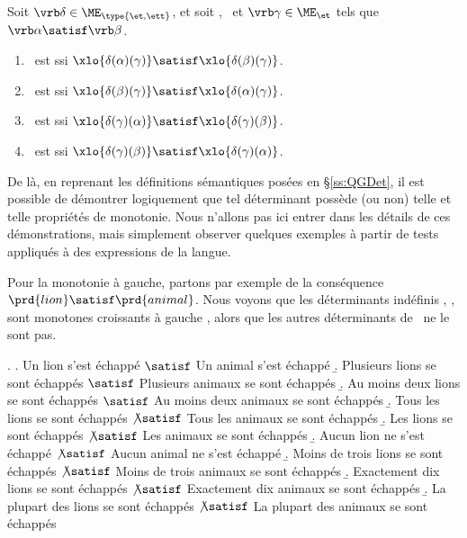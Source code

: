 \begin{defi}
  Soit $\vrb\delta\in\ME_{\type{\et,\ett}}$, et soit
  \vrb\alpha, \vrb\beta\ et $\vrb\gamma\in \ME_{\et}$ tels que $\vrb\alpha\satisf\vrb\beta$. 
\begin{enumerate}
  \item \vrb\delta\ est  ssi $\xlo{\delta(\alpha)(\gamma)}\satisf\xlo{\delta(\beta)(\gamma)}$.
  \item \vrb\delta\ est  ssi $\xlo{\delta(\beta)(\gamma)}\satisf\xlo{\delta(\alpha)(\gamma)}$.
  \item \vrb\delta\ est  ssi $\xlo{\delta(\gamma)(\alpha)}\satisf\xlo{\delta(\gamma)(\beta)}$.
  \item \vrb\delta\ est  ssi $\xlo{\delta(\gamma)(\beta)}\satisf\xlo{\delta(\gamma)(\alpha)}$.
\end{enumerate}
\end{defi}


De là, en reprenant les définitions sémantiques posées en \S\ref{ss:QGDet}, il est possible de démontrer logiquement que tel déterminant possède (ou non) telle et telle propriétés de monotonie.  Nous n'allons pas ici entrer dans les détails de ces démonstrations, mais simplement observer quelques exemples à partir de tests appliqués à des expressions de la langue.


Pour la monotonie à gauche, partons par exemple de la conséquence $\prd{lion}\satisf\prd{animal}$.  Nous voyons que les déterminants indéfinis , ,  sont monotones croissants à gauche \Next[a-c], alors que les autres déterminants de \Next\ ne le sont pas.

\ex.
\a. Un lion s'est échappé $\satisf$ Un animal s'est échappé
\b. Plusieurs lions  se sont échappés $\satisf$ Plusieurs animaux se sont échappés
\b. Au moins deux lions se sont échappés $\satisf$ Au moins deux animaux se sont échappés
\b. Tous les lions  se sont échappés $\not\satisf$ Tous les animaux se sont échappés
\b. Les lions  se sont échappés $\not\satisf$ Les animaux se sont échappés
\b. Aucun lion ne s'est échappé $\not\satisf$ Aucun animal ne s'est échappé
\b. Moins de trois lions se sont échappés $\not\satisf$ Moins de trois animaux se sont échappés
\b. Exactement dix  lions  se sont échappés $\not\satisf$ Exactement dix animaux se sont échappés
\b. La plupart des lions  se sont échappés $\not\satisf$ La plupart des animaux se sont échappés


